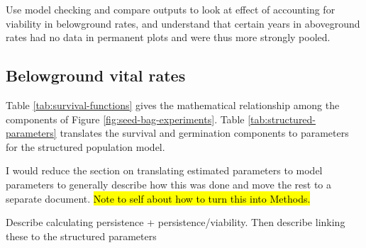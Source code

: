 \documentclass[12pt, oneside, titlepage]{article}   	%
\begin{document}
Use model checking and compare outputs to look at effect of accounting for viability in belowground rates, and understand that certain years in aboveground rates had no data in permanent plots and were thus more strongly pooled. 

\subsection{Belowground vital rates}

 Table \ref{tab:survival-functions} gives the mathematical relationship among the components of Figure \ref{fig:seed-bag-experiments}. Table \ref{tab:structured-parameters} translates the survival and germination components to parameters for the structured population model.
 
 I would reduce the section on translating estimated parameters to model parameters to generally describe how this was done and move the rest to a separate document. \hl{Note to self about how to turn this into Methods.} 

Describe calculating persistence + persistence/viability.
Then describe linking these to the structured parameters
\end{document}
